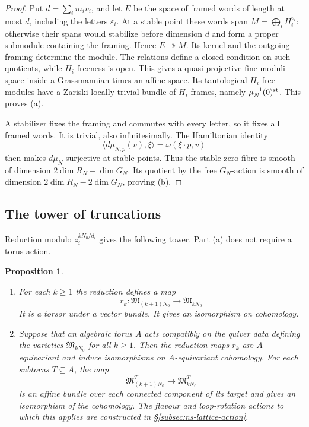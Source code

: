 \documentclass[11pt,reqno]{amsart}
\newtheorem{Proposition}[Theorem]{Proposition}
\theoremstyle{definition}
\theoremstyle{remark}
\begin{document}
\begin{proof}
Put $d=\sum_i m_i v_i$, and let $E$ be the space of framed words
of length at most $d$, including the letters $\varepsilon_i$.
At a stable point these words span $M=\bigoplus_i H_i^{v_i}$:
otherwise their spans would stabilize before dimension $d$ and
form a proper submodule containing the framing. Hence $E\twoheadrightarrow M$.
Its kernel and the outgoing framing determine the module.
The relations define a closed condition on such quotients, while
$H_i$-freeness is open. This gives a quasi-projective fine moduli
space inside a Grassmannian times an affine space. Its tautological
$H_i$-free modules have a Zariski locally trivial bundle of
$H_i$-frames, namely $\mu_N^{-1}(0)^{\rm st}$. This proves (a).

A stabilizer fixes the framing and commutes with every letter,
so it fixes all framed words. It is trivial, also infinitesimally.
The Hamiltonian identity
\[
 \langle d\mu_{N,p}(v),\xi\rangle=\omega(\xi\cdot p,v)
\]
then makes $d\mu_N$ surjective at stable points. Thus the stable
zero fibre is smooth of dimension $2\dim R_N-\dim G_N$.
Its quotient by the free $G_N$-action is smooth of dimension
$2\dim R_N-2\dim G_N$, proving (b).
\end{proof}

\subsection{The tower of truncations}
Reduction modulo $z_i^{kN_0/d_i}$ gives the following tower.
Part (a) does not require a torus action.

\begin{Proposition}\label{prop:ns-truncation-tower}
\hfill
\begin{enumerate}[label=$\mathrm{(\alph*)}$,leftmargin=8mm]
\item
For each $k\geqslant1$ the reduction defines a map
\[
 r_k:\mathfrak M_{(k+1)N_0}\longrightarrow\mathfrak M_{kN_0}
\]
It is a torsor under a vector bundle. 
It gives an isomorphism on cohomology.
\item
Suppose that an algebraic torus $A$ acts compatibly on the quiver
data defining the varieties $\mathfrak M_{kN_0}$ for all $k\geqslant1$. 
Then the reduction maps $r_k$ are
$A$-equivariant and induce isomorphisms on
$A$-equivariant cohomology. For each subtorus $T\subseteq A$, the map
\[
 \mathfrak M_{(k+1)N_0}^{T}\longrightarrow\mathfrak M_{kN_0}^{T}
\]
is an affine bundle over each connected component of its
target and gives an isomorphism of the
cohomology. The flavour and loop-rotation actions to which this
applies are constructed in \S\ref{subsec:ns-lattice-action}.
\end{enumerate}
\end{Proposition}
\end{document}
